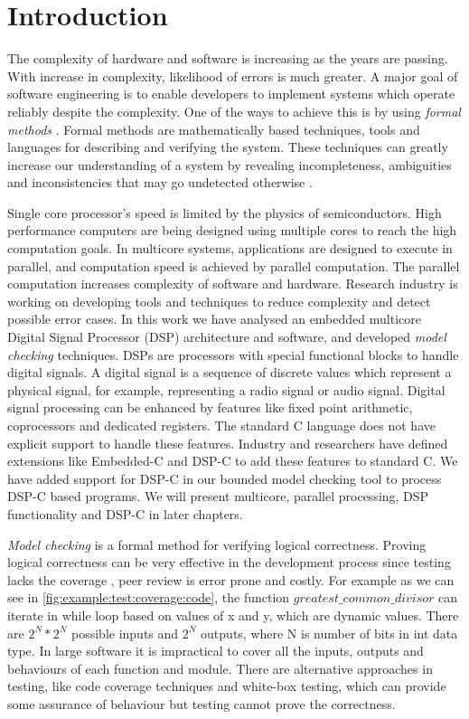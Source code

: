 
\chapter{Introduction}

The complexity of hardware and software is increasing as the years are passing. With increase in complexity, likelihood of errors is much greater. A major goal of software engineering is to enable developers to implement systems which operate reliably despite the complexity. One of the ways to achieve this is by using \emph{formal methods} \cite{clarke1996formal}. Formal methods are mathematically based techniques, tools and languages for describing and verifying the system. These techniques can greatly increase our understanding of a system by revealing incompleteness, ambiguities and inconsistencies that may go undetected otherwise \cite{hall1990seven}.

Single core processor's speed is limited by the physics of semiconductors. High performance computers are being designed using multiple cores to reach the high computation goals. In multicore systems, applications are designed to execute in parallel, and computation speed is achieved by parallel computation. The parallel computation increases complexity of software and hardware. Research industry is working on developing tools and techniques to reduce complexity and detect possible error cases. In this work we have analysed an embedded multicore Digital Signal Processor (DSP) architecture and software, and developed \emph{model checking} techniques. DSPs are processors with special functional blocks to handle digital signals. A digital signal is a sequence of discrete values which represent a physical signal, for example, representing a radio signal or audio signal. Digital signal processing can be enhanced by features like fixed point arithmetic, coprocessors and dedicated registers. The standard C language does not have explicit support to handle these features. Industry and researchers have defined extensions like Embedded-C and DSP-C to add these features to standard C. We have added support for DSP-C in our bounded model checking tool to process DSP-C based programs. We will present multicore, parallel processing, DSP functionality and DSP-C in later chapters.

\emph{Model checking} is a formal method for verifying logical correctness. Proving logical correctness can be very effective in the development process since testing lacks the coverage \cite{zhu1997software}, peer review is error prone and costly. For example as we can see in \autoref{fig:example:test:coverage:code}, the function $greatest\_common\_divisor$ can iterate in while loop based on values of x and y, which are dynamic values. There are $2^N * 2^N$ possible inputs and $2^N$ outputs, where N is number of bits in int data type. In large software it is impractical to cover all the inputs, outputs and behaviours of each function and module. There are alternative approaches in testing, like code coverage techniques and white-box testing, which can provide some assurance of behaviour but testing cannot prove the correctness.


